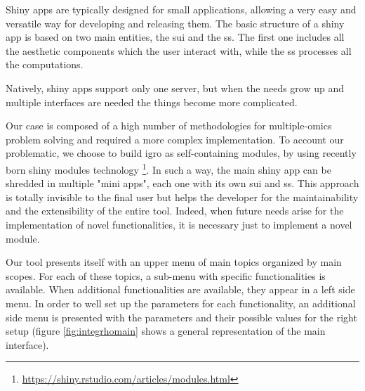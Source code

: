 Shiny apps are typically designed for small applications, allowing a very easy and versatile way for developing and releasing them.
The basic structure of a shiny app is based on two main entities, the \gls{sui} and the \gls{ss}.
The first one includes all the aesthetic components which the user interact with, while the \gls{ss} processes all the computations.

Natively, shiny apps support only one server, but when the needs grow up and multiple interfaces are needed the things become more complicated. 

Our case is composed of a high number of methodologies for multiple-omics problem solving and required a more complex implementation.
To account our problematic, we choose to build \gls{igro} as self-containing modules, by using recently born shiny modules technology \footnote{\url{https://shiny.rstudio.com/articles/modules.html}}.
In such a way, the main shiny app can be shredded in multiple "mini apps", each one with its own \gls{sui} and \gls{ss}.
This approach is totally invisible to the final user but helps the developer for the maintainability and the extensibility of the entire tool.
Indeed, when future needs arise for the implementation of novel functionalities, it is necessary just to implement a novel module.

Our tool presents itself with an upper menu of main topics organized by main scopes. 
For each of these topics, a sub-menu with specific functionalities is available.
When additional functionalities are available, they appear in a left side menu.
In order to well set up the parameters for each functionality, an additional side menu is presented with the parameters and their possible values for the right setup (figure \ref{fig:integrhomain} shows a general representation of the main interface).

